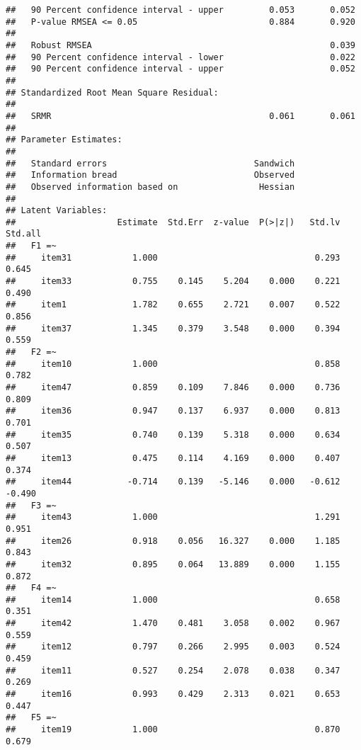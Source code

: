 \documentclass[
  english,
  man]{apa6}
\begin{document}
\begin{verbatim}
##   90 Percent confidence interval - upper         0.053       0.052
##   P-value RMSEA <= 0.05                          0.884       0.920
##                                                                   
##   Robust RMSEA                                               0.039
##   90 Percent confidence interval - lower                     0.022
##   90 Percent confidence interval - upper                     0.052
## 
## Standardized Root Mean Square Residual:
## 
##   SRMR                                           0.061       0.061
## 
## Parameter Estimates:
## 
##   Standard errors                             Sandwich
##   Information bread                           Observed
##   Observed information based on                Hessian
## 
## Latent Variables:
##                    Estimate  Std.Err  z-value  P(>|z|)   Std.lv  Std.all
##   F1 =~                                                                 
##     item31            1.000                               0.293    0.645
##     item33            0.755    0.145    5.204    0.000    0.221    0.490
##     item1             1.782    0.655    2.721    0.007    0.522    0.856
##     item37            1.345    0.379    3.548    0.000    0.394    0.559
##   F2 =~                                                                 
##     item10            1.000                               0.858    0.782
##     item47            0.859    0.109    7.846    0.000    0.736    0.809
##     item36            0.947    0.137    6.937    0.000    0.813    0.701
##     item35            0.740    0.139    5.318    0.000    0.634    0.507
##     item13            0.475    0.114    4.169    0.000    0.407    0.374
##     item44           -0.714    0.139   -5.146    0.000   -0.612   -0.490
##   F3 =~                                                                 
##     item43            1.000                               1.291    0.951
##     item26            0.918    0.056   16.327    0.000    1.185    0.843
##     item32            0.895    0.064   13.889    0.000    1.155    0.872
##   F4 =~                                                                 
##     item14            1.000                               0.658    0.351
##     item42            1.470    0.481    3.058    0.002    0.967    0.559
##     item12            0.797    0.266    2.995    0.003    0.524    0.459
##     item11            0.527    0.254    2.078    0.038    0.347    0.269
##     item16            0.993    0.429    2.313    0.021    0.653    0.447
##   F5 =~                                                                 
##     item19            1.000                               0.870    0.679

\end{verbatim}
\end{document}

